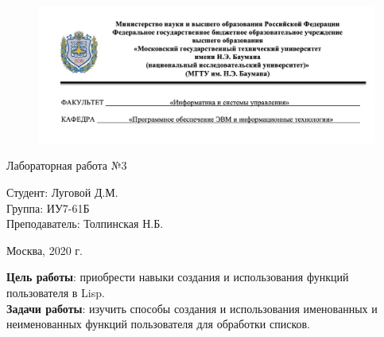 


	
\begin{figure}[h!]
	\begin{center}
		{\includegraphics[width = \textwidth]{titul.png}}
	\end{center}
\end{figure}

\vspace*{20mm}

\huge
\begin{center}
	Лабораторная работа №3
\end{center}


\vspace*{50mm}

\large
\begin{flushleft}
	Студент: Луговой Д.М. \\
	Группа: ИУ7-61Б \\
	Преподаватель: Толпинская Н.Б.
\end{flushleft}

\vspace*{60mm}

\large
\begin{center}
	Москва, 2020 г.
\end{center}

\thispagestyle{empty}

\newpage
\vspace*{10mm}
\textbf{Цель работы}: приобрести навыки создания и использования функций пользователя в Lisp.\\

\textbf{Задачи работы}: изучить способы создания и использования именованных и неименованных функций пользователя для обработки списков.


